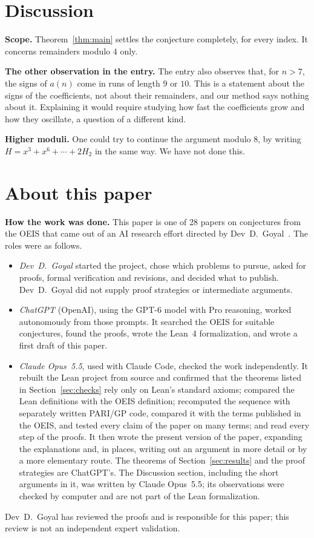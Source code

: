 \documentclass[11pt,a4paper]{article}
\theoremstyle{definition}
\theoremstyle{remark}
\newcommand{\para}[1]{\par\medskip\noindent\textbf{#1}\enspace}
\begin{document}
\section{Discussion}\label{sec:discussion}

\para{Scope.} Theorem~\ref{thm:main} settles the conjecture completely, for every index. It concerns remainders modulo
$4$ only.

\para{The other observation in the entry.} The entry also observes that, for $n>7$, the signs of $a(n)$ come in runs
of length $9$ or $10$. This is a statement about the signs of the coefficients, not about their remainders, and our method
says nothing about it. Explaining it would require studying how fast the coefficients grow and how they oscillate, a
question of a different kind.

\para{Higher moduli.} One could try to continue the argument modulo $8$, by writing $H=x^3+x^6+\cdots+2H_2$ in the same
way. We have not done this.

\section*{About this paper}\label{sec:about}
\para{How the work was done.}
This paper is one of 28 papers on conjectures from the OEIS that came out of an AI research effort directed by
Dev~D.~Goyal~\cite{repo}. The roles were as follows.
\begin{itemize}
\item \emph{Dev~D.~Goyal} started the project, chose which problems to pursue, asked for proofs, formal verification and
revisions, and decided what to publish. Dev~D.~Goyal did not supply proof strategies or intermediate arguments.
\item \emph{ChatGPT} (OpenAI), using the GPT-6 model with Pro reasoning, worked autonomously from those prompts. It
searched the OEIS for suitable conjectures, found the proofs, wrote the Lean~4 formalization, and wrote a first draft
of this paper.
\item \emph{Claude Opus~5.5}, used with Claude Code, checked the work independently. It rebuilt the Lean project from source and confirmed that the theorems listed in Section~\ref{sec:checks} rely only on
Lean's standard axioms; compared the Lean definitions with the OEIS definition; recomputed the sequence with separately
written PARI/GP code, compared it with the terms published in the OEIS, and tested every claim of the paper on many
terms; and read every step of the proofs. It then wrote the present version of the paper, expanding the
explanations and, in places, writing out an argument in more detail or by a more elementary route. The theorems of
Section~\ref{sec:results} and the proof strategies are ChatGPT's. The Discussion section, including the short arguments
in it, was written by Claude Opus~5.5; its observations were checked by computer and are not part of the Lean
formalization.
\end{itemize}
Dev~D.~Goyal has reviewed the proofs and is responsible for this paper; this review is not an independent expert
validation.
\end{document}
